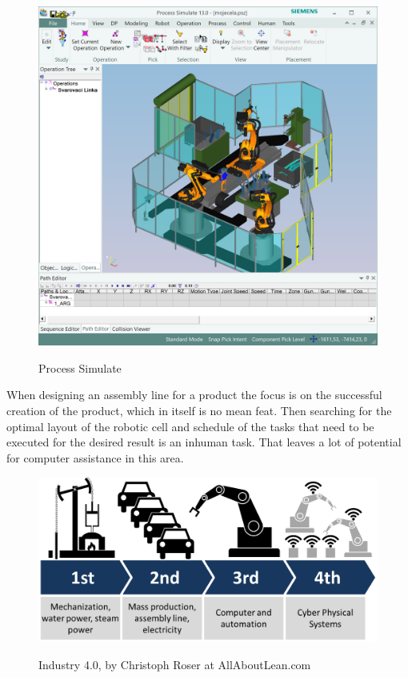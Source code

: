 \begin{figure}[ht]
	\caption{Process Simulate}
	\centering
	  \includegraphics[width=1\textwidth]{process-simulate}
	\label{fig:ProcessSimulate}
\end{figure}

When designing an assembly line for a product the focus is on the successful creation of the product, which in itself is no mean feat. 
Then searching for the optimal layout of the robotic cell and schedule of the tasks that need to be executed for the desired result is an inhuman task. That leaves a lot of potential for computer assistance in this area. \\ 

\begin{figure}[ht]
	\caption{Industry 4.0, by Christoph Roser at AllAboutLean.com}
	\centering
	  \includegraphics[width=1\textwidth]{industry-40.png}
	\label{fig:Industry40}
\end{figure}

